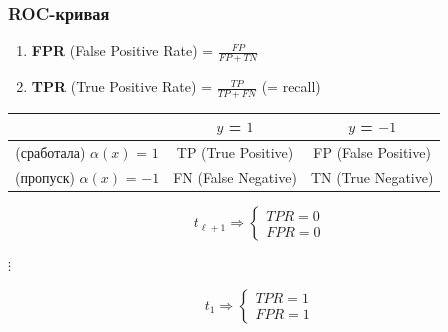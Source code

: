 
            \subsubsection{ROC-кривая}
                \begin{enumerate}
                    \item \textbf{FPR} (False Positive Rate) = $\frac{FP}{FP + TN}$
                    \item \textbf{TPR} (True Positive Rate) = $\frac{TP}{TP + FN}$ (= recall)
                \end{enumerate}

                \begin{table}[ht]
                    \centering
                    \begin{tabular}{|c|c|c|}
                    \hline
                     & $y$ = $1$ & $y$ = $-1$ \\
                    \hline
                    (сработала) $\alpha(x)$ = $1$ & TP (True Positive) & FP (False Positive)\\
                    \hline
                    (пропуск) $\alpha(x)$ = $-1$ & FN (False Negative) & TN (True Negative)\\
                    \hline
                    \end{tabular}
                \end{table}

                \begin{equation*}
                 t_{\ell + 1} \Longrightarrow
                     \begin{cases}
                       TPR = 0
                       \\
                       FPR = 0
                     \end{cases}
                    \end{equation*}
                    \begin{center}
                        $\vdots$
                    \end{center}
                    \begin{equation*}
                     t_{1} \Longrightarrow
                     \begin{cases}
                       TPR = 1
                       \\
                       FPR = 1
                     \end{cases}
                \end{equation*}

